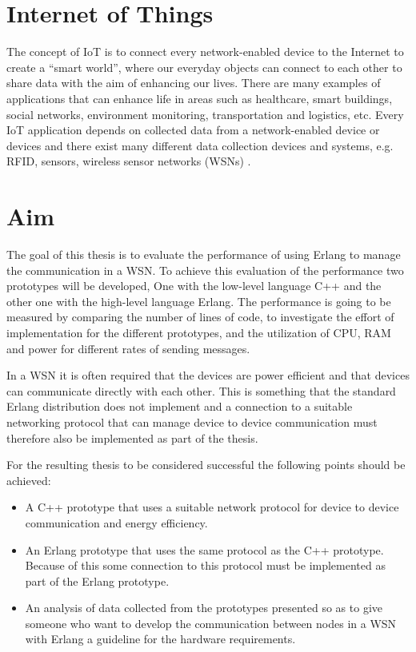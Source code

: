\section{Internet of Things}\label{sec:intro_iot}
The concept of IoT is to connect every network-enabled device to the Internet to create a “smart world”, where our everyday objects can connect to each other to share data with the aim of enhancing our lives. There are many examples of applications that can enhance life in areas such as healthcare, smart buildings, social networks, environment monitoring, transportation and logistics, etc. Every IoT application depends on collected data from a network-enabled device or devices and there exist many different data collection devices and systems, e.g. RFID, sensors, wireless sensor networks (WSNs) \citep{yang2014internet}.

\section{Aim}
The goal of this thesis is to evaluate the performance of using Erlang to manage the communication in a WSN. To achieve this evaluation of the performance two prototypes will be developed, One with the low-level language C++ and the other one with the high-level language Erlang. The performance is going to be measured by comparing the number of lines of code, to investigate the effort of implementation for the different prototypes, and the utilization of CPU, RAM and power for different rates of sending messages.

In a WSN it is often required that the devices are power efficient and that devices can communicate directly with each other. This is something that the standard Erlang distribution does not implement and a connection to a suitable networking protocol that can manage device to device communication must therefore also be implemented as part of the thesis.

For the resulting thesis to be considered successful the following points should be achieved:

\begin{itemize} 
    \item A C++ prototype that uses a suitable network protocol for device to device communication and energy efficiency. 
    \item An Erlang prototype that uses the same protocol as the C++ prototype. Because of this some connection to this protocol must be implemented as part of the Erlang prototype. 
    \item An analysis of data collected from the prototypes presented so as to give someone who want to develop the communication between nodes in a WSN with Erlang a guideline for the hardware requirements.   
\end{itemize}

